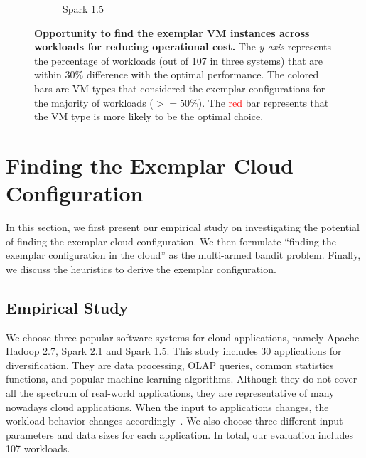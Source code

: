 \begin{figure}[!htbp]
\begin{subfigure}[b]{0.5\textwidth}
    \caption{Spark 1.5}
    \label{fig:motivation_percentage_3}
\end{subfigure}
\caption{\textbf{Opportunity to find the exemplar VM instances across workloads for reducing operational cost.} The \emph{y-axis} represents the percentage of workloads (out of 107 in three systems) that are within 30\% difference with the optimal performance.  The colored bars are VM types that considered the exemplar configurations for the majority of workloads ($>= 50\%$).
 The \textcolor{red}{red} bar represents that the VM type is more likely to be the optimal choice.}
\label{fig:motivation_percentage}
\end{figure}


\section{Finding the Exemplar Cloud Configuration}
\label{sec:mab}

In this section, we first present our empirical study
on investigating the potential of finding the exemplar cloud configuration.
We then formulate ``finding the exemplar configuration in the cloud'' as the multi-armed bandit problem.
Finally, we discuss the heuristics to derive the exemplar configuration.



\subsection{Empirical Study}
\label{sec:empirical}

We choose three popular software systems for cloud applications, namely Apache Hadoop 2.7, Spark 2.1 and Spark 1.5.
This study includes 30 applications for diversification.
They are data processing, OLAP queries, common statistics functions, and
popular machine learning algorithms.
Although they do not cover all the spectrum of real-world applications,
they are representative of many nowadays cloud applications.
When the input to applications changes, the workload behavior changes accordingly~\cite{Venkataraman2016, Dalibard2017}.
We also choose three different input parameters and data sizes for each application.
In total, our evaluation includes 107 workloads.

